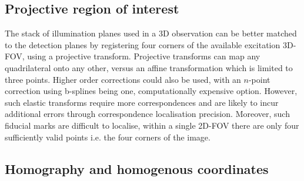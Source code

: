 \subsection{Projective region of interest}

The stack of illumination planes used in a \gls{3D} observation can be better matched to the detection planes by registering four corners of the available excitation \gls{3D}-\gls{FOV}, using a projective transform. %
Projective transforms can map any quadrilateral onto any other, versus an affine transformation which is limited to three points.
Higher order corrections could also be used, with an $n$-point correction using b-splines being one, computationally expensive option.
However, such elastic transforms require more correspondences and are likely to incur additional errors through correspondence localisation precision.
Moreover, such fiducial marks are difficult to localise, within a single \gls{2D}-\gls{FOV} there are only four sufficiently valid points i.e. the four corners of the image.%


\subsection{Homography and homogenous coordinates}

